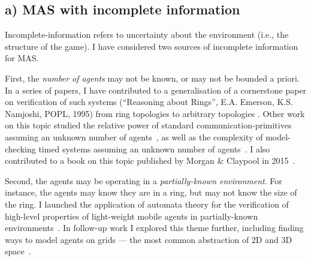 \documentclass[10pt,a4paper,sans]{moderncv}
\begin{document}
\subsection{a) MAS with incomplete information}
Incomplete-information refers to uncertainty about the environment (i.e., the structure of the game). I have considered two sources of incomplete information for MAS.
\newline


First, the \emph{number of agents} may not be known, or may not be bounded a priori.
In a series of papers, I have contributed to a generalisation of a cornerstone paper on verification of such systems (``Reasoning about Rings'', E.A. Emerson, K.S. Namjoshi, 
\textsc{POPL}, 1995) from ring topologies to arbitrary topologies \cite{DBLP:conf/vmcai/AminofJKR14,DBLP:conf/concur/AminofKRSV14,DBLP:conf/cade/AminofR16,AKRSV17}. Other work on this topic 
studied the relative power of standard communication-primitives assuming an unknown number of agents~\cite{DBLP:conf/lpar/AminofRZ15}, as well as the complexity of model-checking timed systems assuming an unknown number of agents~\cite{DBLP:conf/icalp/AminofRZS15}. I also contributed to a book on this topic published by Morgan \& Claypool in 2015~\cite{DBLP:series/synthesis/2015Bloem,DBLP:journals/sigact/BloemJKKRVW16}.
\newline



Second, the agents may be operating in a \emph{partially-known environment}. For instance, the agents may know they are in a ring, but may not know the size of the ring. I launched the application of automata theory for the verification of high-level properties of light-weight mobile agents in partially-known environments~\cite{DBLP:conf/atal/Rubin15}. In follow-up work I explored this theme further, including finding ways to model agents on grids --- the most common abstraction of 2D and 3D space~\cite{DBLP:conf/prima/RubinZMA15,DBLP:conf/atal/AminofMRZ16,DBLP:conf/prima/MuranoPR15}.
\newline  
\end{document}
